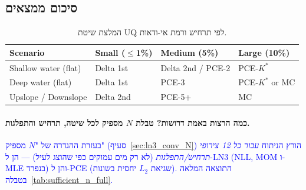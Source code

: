 \documentclass[12pt,a4paper]{article}
\DeclareRobustCommand{\aiedit}[1]{\textcolor{blue}{#1}}
\begin{document}
\subsection{סיכום ממצאים}
\label{sec:findings_summary}

\begin{table}[H]
  \centering
  \caption{המלצת שיטת UQ לפי תרחיש ורמת אי-ודאות.}
  \label{tab:recommendation}
  \begin{english}
  \begin{tabular}{llll}
    \toprule
    Scenario & Small ($\leq$1\%) & Medium (5\%) & Large (10\%) \\
    \midrule
    Shallow water (flat)   & Delta 1st  & Delta 2nd / PCE-2 & PCE-$K^*$ \\
    Deep water (flat)      & Delta 1st  & PCE-3              & PCE-$K^*$ or MC \\
    Upslope / Downslope    & Delta 2nd  & PCE-5+             & MC \\
    \bottomrule
  \end{tabular}
  \end{english}
\end{table}

\paragraph{כמה הרצות באמת דרושות? טבלת $N$ מספיק לכל שיטה, תרחיש והתפלגות.}
\aiedit{בעזרת ההגדרה של "$N$ מספיק" (סעיף~\ref{sec:ln3_conv_N}) הורץ הניתוח \emph{עבור כל 12
צירופי תרחיש/התפלגות} (לא רק מים עמוקים כפי שהוצג לעיל) — הן ל-LN3 (NLL, MOM ו-MLE
בנפרד) והן ל-PCE (שגיאת $L_2$ יחסית בשונות). התוצאה המלאה בטבלה~\ref{tab:sufficient_n_full}.}
\end{document}
